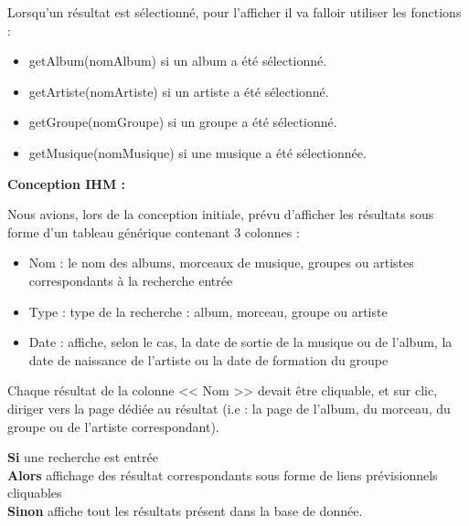            \begin{paragraphe}
                 Lorsqu'un résultat est sélectionné, pour l'afficher il va falloir utiliser les fonctions :
                \begin{itemize}
                    \item getAlbum(nomAlbum) si un album a été sélectionné.
                    \item getArtiste(nomArtiste) si un artiste a été sélectionné.
                    \item getGroupe(nomGroupe) si un groupe a été sélectionné.
                    \item getMusique(nomMusique) si une musique a été sélectionnée.
                \end{itemize}
            \end{paragraphe}

			\begin{paragraphe}
				\textbf{Conception IHM :}
			\end{paragraphe}

			\begin{paragraphe}
			    Nous avions, lors de la conception initiale, prévu d'afficher les résultats sous forme d'un tableau générique contenant 3 colonnes :
				\begin{itemize}
					\item Nom : le nom des albums, morceaux de musique, groupes ou artistes correspondants à la recherche entrée
					\item Type : type de la recherche : album, morceau, groupe ou artiste
					\item Date : affiche, selon le cas, la date de sortie de la musique ou de l'album, la date de naissance de l'artiste ou la date de formation du groupe
				\end{itemize}
				Chaque résultat de la colonne << Nom >> devait être cliquable, et sur clic, diriger vers la page dédiée au résultat (i.e : la page de l'album, du morceau, du groupe ou de l'artiste correspondant).
			\end{paragraphe}
            

            \begin{paragraphe}
                \textbf{Si} une recherche est entrée\\
                \textbf{Alors} affichage des résultat correspondants sous forme de liens prévisionnels cliquables\\
                \textbf{Sinon} affiche tout les résultats présent dans la base de donnée.
            \end{paragraphe}

